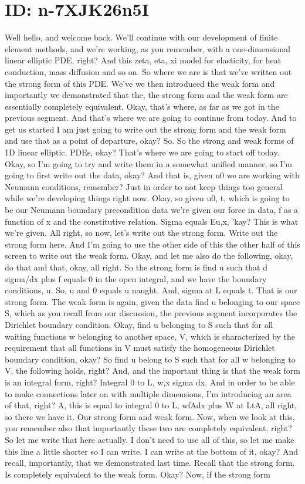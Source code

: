 \documentclass[10pt]{article}
\begin{document}
\section*{ID: n-7XJK26n5I}
Well hello, and welcome back. We'll continue with our development of finite element methods, and we're working, as you remember, with a one-dimensional linear elliptic PDE, right? And this zeta, eta, xi model for elasticity, for heat conduction, mass diffusion and so on. So where we are is that we've written out the strong form of this PDE. We've we then introduced the weak form and importantly we demonstrated that the, the strong form and the weak form are essentially completely equivalent. Okay, that's where, as far as we got in the previous segment. And that's where we are going to continue from today. And to get us started I am just going to write out the strong form and the weak form and use that as a point of departure, okay? So. So the strong and weak forms of 1D linear elliptic. PDEs, okay? That's where we are going to start off today. Okay, so I'm going to try and write them in a somewhat unified manner, so I'm going to first write out the data, okay? And that is, given u0 we are working with Neumann conditions, remember? Just in order to not keep things too general while we're developing things right now. Okay, so given u0, t, which is going to be our Neumann boundary precondition data we're given our force in data, f as a function of x and the constitutive relation. Sigma equals Eu,x, 'kay? This is what we're given. All right, so now, let's write out the strong form. Write out the strong form here. And I'm going to use the other side of this the other half of this screen to write out the weak form. Okay, and let me also do the following, okay, do that and that, okay, all right. So the strong form is find u such that d sigma/dx plus f equals 0 in the open integral, and we have the boundary conditions, u. So, u and 0 equals u naught. And, sigma at L equals t. That is our strong form. The weak form is again, given the data find u belonging to our space S, which as you recall from our discussion, the previous segment incorporates the Dirichlet boundary condition. Okay, find u belonging to S such that for all waiting functions w belonging to another space, V, which is characterized by the requirement that all functions in V must satisfy the homogeneous Dirichlet boundary condition, okay? So find u belong to S such that for all w belonging to V, the following holds, right? And, and the important thing is that the weak form is an integral form, right? Integral 0 to L, w,x sigma dx. And in order to be able to make connections later on with multiple dimensions, I'm introducing an area of that, right? A, this is equal to integral 0 to L, wfAdx plus W at LtA, all right, so there we have it. Our strong form and weak form. Now, when we look at this, you remember also that importantly these two are completely equivalent, right? So let me write that here actually. I don't need to use all of this, so let me make this line a little shorter so I can write. I can write at the bottom of it, okay? And recall, importantly, that we demonstrated last time. Recall that the strong form. Is completely equivalent to the weak form. Okay? Now, if the strong form 
\end{document}
